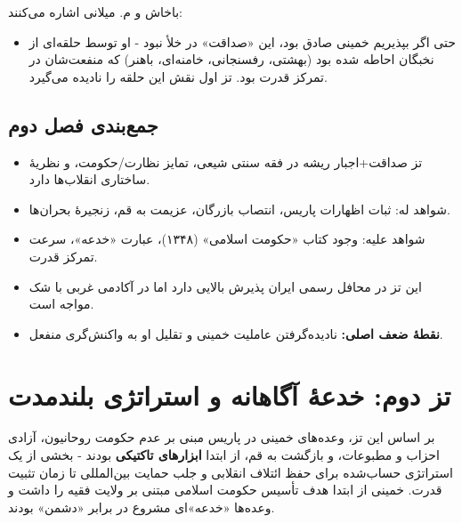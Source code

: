 \documentclass[12pt,a4paper]{book}
\newcommand{\keyword}[1]{\textbf{\textcolor{cPrimary}{#1}}}
\begin{document}
باخاش و م. میلانی اشاره می‌کنند:

\begin{itemize}[label=\textcolor{cConsolid}{$\times$}, rightmargin=2em]
    \item حتی اگر بپذیریم خمینی صادق بود، این «صداقت» در خلأ نبود - او توسط حلقه‌ای از نخبگان احاطه شده بود (بهشتی، رفسنجانی، خامنه‌ای، باهنر) که منفعت‌شان در تمرکز قدرت بود. تز اول نقش این حلقه را نادیده می‌گیرد.
\end{itemize}

\section{جمع‌بندی فصل دوم}

\begin{principleBox}
\begin{itemize}[label=\textcolor{cPrimary}{$\blacksquare$}, rightmargin=2em]
    \item تز صداقت+اجبار ریشه در فقه سنتی شیعی، تمایز نظارت/حکومت، و نظریهٔ ساختاری انقلاب‌ها دارد.
    \item شواهد له: ثبات اظهارات پاریس، انتصاب بازرگان، عزیمت به قم، زنجیرهٔ بحران‌ها.
    \item شواهد علیه: وجود کتاب «حکومت اسلامی» (۱۳۴۸)، عبارت «خدعه»، سرعت تمرکز قدرت.
    \item این تز در محافل رسمی ایران پذیرش بالایی دارد اما در آکادمی غربی با شک مواجه است.
    \item \keyword{نقطهٔ ضعف اصلی:} نادیده‌گرفتن عاملیت خمینی و تقلیل او به واکنش‌گری منفعل.
\end{itemize}
\end{principleBox}


\chapter{تز دوم: خدعهٔ آگاهانه و استراتژی بلندمدت}
\label{chap:df30f0}


\begin{infoBox}
بر اساس این تز، وعده‌های خمینی در پاریس مبنی بر عدم حکومت روحانیون، آزادی احزاب و مطبوعات، و بازگشت به قم، از ابتدا \keyword{ابزارهای تاکتیکی} بودند - بخشی از یک استراتژی حساب‌شده برای حفظ ائتلاف انقلابی و جلب حمایت بین‌المللی تا زمان تثبیت قدرت. خمینی از ابتدا هدف تأسیس حکومت اسلامی مبتنی بر ولایت فقیه را داشت و وعده‌ها «خدعه»ای مشروع در برابر «دشمن» بودند.
\end{infoBox}
\end{document}
